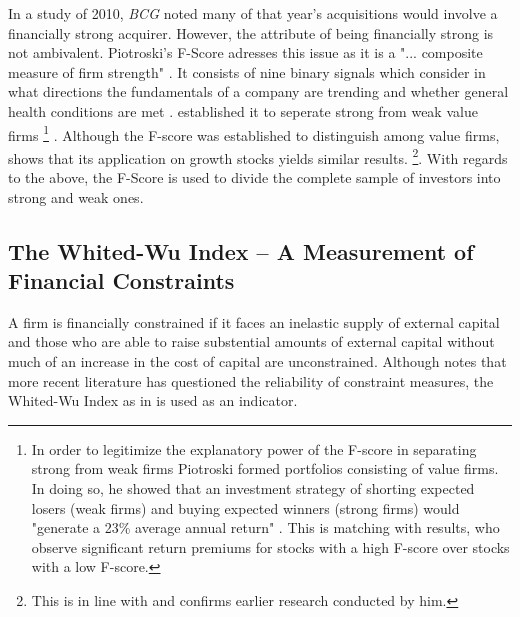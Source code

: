 \documentclass[12pt]{article}
\begin{document}
In a study of 2010, \emph{BCG} noted many of that year's acquisitions would involve a financially strong acquirer. However, the attribute of being financially strong is not ambivalent. Piotroski's F-Score adresses this issue as it is a "... composite measure of firm strength" \citep[p. 496]{Fama2006}. It consists of nine binary signals which consider in what directions the fundamentals of a company are trending and whether general health conditions are met \citep{Mohr2012}. \citet{Piotroski2000} established it to seperate strong from weak value firms
	\footnote{In order to legitimize the explanatory power of the F-score in separating strong from weak firms Piotroski formed portfolios consisting of value firms. In doing so, he showed that an investment strategy of shorting expected losers (weak firms) and buying expected winners (strong firms) would "generate a 23\% average annual return" \citep[p. 4]{Piotroski2000}. This is matching with \citet{Hyde2014} results, who observe significant return premiums for stocks with a high F-score over stocks with a low F-score.}
. 
Although the F-score was established to distinguish among value firms, \citet{Mohr2012} shows that its application on growth stocks yields similar results.
	\footnote{This is in line with \citet{Piotroski2000} and confirms earlier research conducted by him.}. 
With regards to the above, the F-Score is used to divide the complete sample of investors into strong and weak ones.

\subsection{The Whited-Wu Index -- A Measurement of Financial Constraints}
A firm is financially constrained if it faces an inelastic supply of external capital \citep{Farre-mensa2013} and those who are able to raise substential amounts of external capital without much of an increase in the cost of capital are unconstrained. Although \citet{Khatami2014} notes that more recent literature has questioned the reliability of constraint measures, the Whited-Wu Index as in \citet{Liao2010} is used as an indicator. 
\end{document}
